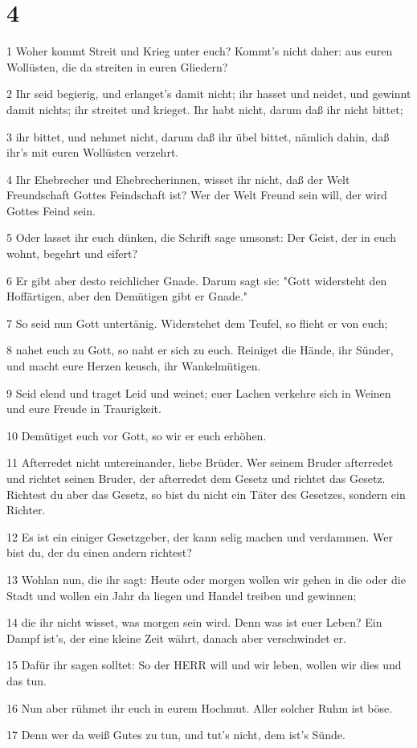 \chapter{4}

\par 1 Woher kommt Streit und Krieg unter euch? Kommt's nicht daher: aus euren Wollüsten, die da streiten in euren Gliedern?
\par 2 Ihr seid begierig, und erlanget's damit nicht; ihr hasset und neidet, und gewinnt damit nichts; ihr streitet und krieget. Ihr habt nicht, darum daß ihr nicht bittet;
\par 3 ihr bittet, und nehmet nicht, darum daß ihr übel bittet, nämlich dahin, daß ihr's mit euren Wollüsten verzehrt.
\par 4 Ihr Ehebrecher und Ehebrecherinnen, wisset ihr nicht, daß der Welt Freundschaft Gottes Feindschaft ist? Wer der Welt Freund sein will, der wird Gottes Feind sein.
\par 5 Oder lasset ihr euch dünken, die Schrift sage umsonst: Der Geist, der in euch wohnt, begehrt und eifert?
\par 6 Er gibt aber desto reichlicher Gnade. Darum sagt sie: "Gott widersteht den Hoffärtigen, aber den Demütigen gibt er Gnade."
\par 7 So seid nun Gott untertänig. Widerstehet dem Teufel, so flieht er von euch;
\par 8 nahet euch zu Gott, so naht er sich zu euch. Reiniget die Hände, ihr Sünder, und macht eure Herzen keusch, ihr Wankelmütigen.
\par 9 Seid elend und traget Leid und weinet; euer Lachen verkehre sich in Weinen und eure Freude in Traurigkeit.
\par 10 Demütiget euch vor Gott, so wir er euch erhöhen.
\par 11 Afterredet nicht untereinander, liebe Brüder. Wer seinem Bruder afterredet und richtet seinen Bruder, der afterredet dem Gesetz und richtet das Gesetz. Richtest du aber das Gesetz, so bist du nicht ein Täter des Gesetzes, sondern ein Richter.
\par 12 Es ist ein einiger Gesetzgeber, der kann selig machen und verdammen. Wer bist du, der du einen andern richtest?
\par 13 Wohlan nun, die ihr sagt: Heute oder morgen wollen wir gehen in die oder die Stadt und wollen ein Jahr da liegen und Handel treiben und gewinnen;
\par 14 die ihr nicht wisset, was morgen sein wird. Denn was ist euer Leben? Ein Dampf ist's, der eine kleine Zeit währt, danach aber verschwindet er.
\par 15 Dafür ihr sagen solltet: So der HERR will und wir leben, wollen wir dies und das tun.
\par 16 Nun aber rühmet ihr euch in eurem Hochmut. Aller solcher Ruhm ist böse.
\par 17 Denn wer da weiß Gutes zu tun, und tut's nicht, dem ist's Sünde.

